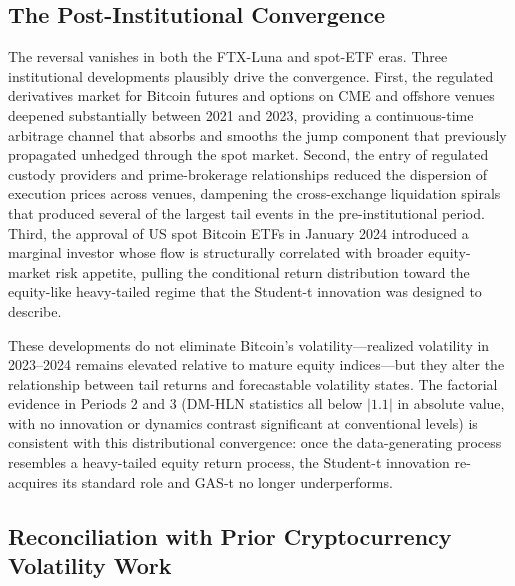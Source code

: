 \subsection{The Post-Institutional Convergence}

The reversal vanishes in both the FTX-Luna and spot-ETF eras. Three institutional developments plausibly drive the convergence. First, the regulated derivatives market for Bitcoin futures and options on CME and offshore venues deepened substantially between 2021 and 2023, providing a continuous-time arbitrage channel that absorbs and smooths the jump component that previously propagated unhedged through the spot market. Second, the entry of regulated custody providers and prime-brokerage relationships reduced the dispersion of execution prices across venues, dampening the cross-exchange liquidation spirals that produced several of the largest tail events in the pre-institutional period. Third, the approval of US spot Bitcoin ETFs in January 2024 introduced a marginal investor whose flow is structurally correlated with broader equity-market risk appetite, pulling the conditional return distribution toward the equity-like heavy-tailed regime that the Student-t innovation was designed to describe.

These developments do not eliminate Bitcoin's volatility---realized volatility in 2023--2024 remains elevated relative to mature equity indices---but they alter the relationship between tail returns and forecastable volatility states. The factorial evidence in Periods 2 and 3 (DM-HLN statistics all below $|1.1|$ in absolute value, with no innovation or dynamics contrast significant at conventional levels) is consistent with this distributional convergence: once the data-generating process resembles a heavy-tailed equity return process, the Student-t innovation re-acquires its standard role and GAS-t no longer underperforms.

\subsection{Reconciliation with Prior Cryptocurrency Volatility Work}

